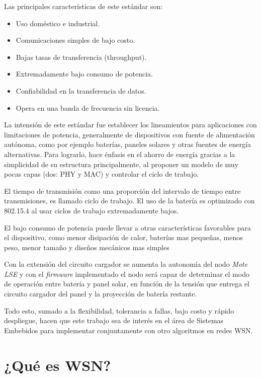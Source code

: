 \noindent Las principales características de este estándar son:
		\begin{itemize}
			\item Uso doméstico e industrial.
			\item Comunicaciones simples de bajo costo. 
			\item Bajas tasas de transferencia (throughput).
			\item Extremadamente bajo consumo de potencia.
			\item Confiabilidad en la transferencia de datos.
			\item Opera en una banda de frecuencia sin licencia.
		\end{itemize}

La intensión de este estándar fue establecer los lineamientos para aplicaciones con limitaciones de potencia, generalmente de dispositivos con fuente de alimentación autónoma, como por ejemplo baterías, paneles solares y otras fuentes de energía alternativas. Para lograrlo, hace énfasis en el ahorro de energía gracias a la simplicidad de su estructura principalmente, al proponer un modelo de muy pocas capas (dos: PHY y MAC) y controlar el ciclo de trabajo.

El tiempo de transmisión como una proporción del intervalo de tiempo entre transmisiones, es llamado ciclo de trabajo. El uso de la batería es optimizado con 802.15.4 al usar ciclos de trabajo extremadamente bajos. 

El bajo consumo de potencia puede llevar a otras características favorables para el dispositivo, como menor disipación de calor, baterías mas pequeñas, menos peso, menor tamaño y diseños mecánicos mas simples
		
Con la extensión del circuito cargador se aumenta la autonomía del nodo \textit{Mote LSE} y con el \textit{firmware} implementado el nodo será capaz de determinar el modo de operación entre batería y panel solar, en función de la tensión que entrega el circuito cargador del panel y la proyección de batería restante.

Todo esto, sumado a la flexibilidad, tolerancia a fallas, bajo costo y rápido despliegue, hacen que este trabajo sea de interés en el área de Sistemas Embebidos para implementar conjuntamente con otro algoritmos en redes WSN.

\section{¿Qué es WSN?}
\label{sec:wsn}

